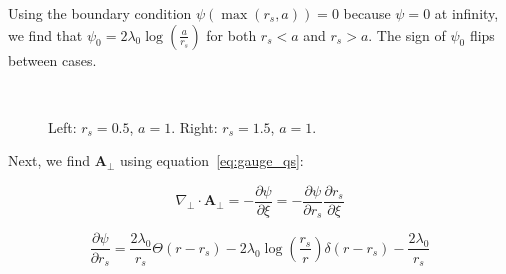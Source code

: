 \documentclass[aps,prl,preprint,groupedaddress]{revtex4-1}
\begin{document}
Using the boundary condition $\psi(\max(r_s,a)) = 0$ because $\psi = 0$ at infinity, we find that $\psi_0 = 2\lambda_0 \log\left(\frac{a}{r_s}\right)$ for both $r_s < a$ and $r_s > a$. The sign of $\psi_0$ flips between cases. 


\begin{figure}
\centering
\mbox{\quad
{}}
\caption{Left: $r_s = 0.5$, $a=1$. Right: $r_s = 1.5$, $a=1$.} \label{fig12}
\end{figure}

Next, we find $\mathbf{A}_{\perp}$ using equation~\ref{eq:gauge_qs}:

\begin{equation}\label{eq:a_perp}
\nabla_\perp \cdot \mathbf{A}_\perp = -\frac{\partial \psi}{\partial \xi} = - \frac{\partial \psi}{\partial r_s}\frac{\partial r_s}{\partial \xi}
\end{equation}

\begin{equation}\label{eq:dpsi}
\frac{\partial \psi}{\partial r_s} = \frac{2\lambda_0}{r_s}\Theta(r-r_s) - 2\lambda_0 \log\left(\frac{r_s}{r}\right)\delta(r-r_s) - \frac{2\lambda_0}{r_s} 
\end{equation}
\end{document}
